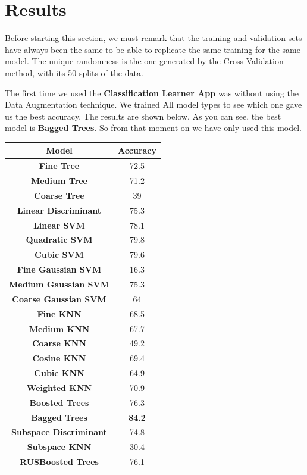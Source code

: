 \documentclass[11]{article}
\begin{document}
\section{Results}
\label{sec:results}

Before starting this section, we must remark that the training and validation sets have always been the same to be able to replicate the same training for the same model. The unique  randomness is the one generated by the Cross-Validation method, with its 50 splits of the data.

The first time we used the \textbf{Classification Learner App} was without using the Data Augmentation technique. We trained All model types to see which one gave us the best accuracy. The results are shown below. As you can see, the best model is \textbf{Bagged Trees}. So from that moment on we have only used this model.

\begin{center}
\centering
\begin{tabular}{ |c|c| } 
 \hline
 \textbf{Model} & \textbf{Accuracy} \\
  \hline
 \textbf{Fine Tree} & 72.5  \\ 
   \hline
 \textbf{Medium Tree} & 71.2  \\ 
   \hline
 \textbf{Coarse Tree} & 39  \\ 
   \hline
 \textbf{Linear Discriminant} & 75.3  \\ 
   \hline
 \textbf{Linear SVM} & 78.1  \\ 
   \hline
 \textbf{Quadratic SVM} & 79.8  \\ 
   \hline
 \textbf{Cubic SVM} & 79.6  \\ 
   \hline
 \textbf{Fine Gaussian SVM} & 16.3  \\ 
   \hline
 \textbf{Medium Gaussian SVM} & 75.3  \\ 
   \hline
 \textbf{Coarse Gaussian SVM} & 64  \\ 
   \hline
 \textbf{Fine KNN} & 68.5  \\ 
   \hline
 \textbf{Medium KNN} & 67.7  \\ 
   \hline
 \textbf{Coarse KNN} & 49.2  \\ 
   \hline
 \textbf{Cosine KNN} & 69.4  \\ 
   \hline
 \textbf{Cubic KNN} & 64.9  \\ 
   \hline
 \textbf{Weighted KNN} & 70.9  \\ 
   \hline
 \textbf{Boosted Trees} & 76.3  \\ 
   \hline
 \textbf{Bagged Trees} & \textbf{84.2}  \\ 
   \hline
 \textbf{Subspace Discriminant} & 74.8  \\ 
   \hline
 \textbf{Subspace KNN} & 30.4  \\ 
   \hline
 \textbf{RUSBoosted Trees} & 76.1  \\ 
 \hline
\end{tabular}
\end{center}
\end{document}
